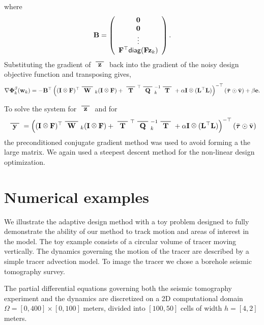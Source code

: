 \documentclass[final,leqno,onefignum,onetabnum]{siamltexmm}
\begin{document}
%
where 
%
\begin{align}
{\bf{B}} =  \left(\begin{array}{c} {\bf 0} \\ {\bf 0}\\ \vdots\\ {\bf{F}}^{\top}{\sf diag}({\bf{F}}{\bf{z}}_k) \end{array}\right).
\end{align}
%
Substituting the gradient of $\zbar $ back into the gradient of the noisy design objective function and transposing gives,
%
\begin{align}
\nabla \bfPhi_k^{\beta}(\bfw_k) = -\bfB^{\top}\left((\bfI \kronecker \bfF)^{\top}\Wbar_k(\bfI \kronecker \bfF)  +
\Tbar^{\top}\Qbar^{-1}_k\Tbar + \alpha \bfI \kronecker(\LtL)
\right)^{- \top}(\bar{\bftau} \odot \bar{\bfv}) + \beta\bfe.
\end{align}
%

To solve the system for $\zbar$ and for
%
\begin{align}
\ybar = \left((\bfI \kronecker \bfF)^{\top}\Wbar_k(\bfI \kronecker \bfF)  +
\Tbar^{\top}\Qbar^{-1}_k\Tbar + \alpha \bfI \kronecker(\LtL)
\right)^{- \top}(\bar{\bftau} \odot \bar{\bfv}) 
\end{align}
%
the preconditioned conjugate gradient method was used 
to avoid forming a the large matrix. We again used a steepest descent method for the non-linear design optimization. 
%
%
%
\section{Numerical examples}
\label{sec: Example1}
We illustrate the adaptive  design method  with a toy problem designed to fully demonstrate the ability of our method to track  motion and areas of interest in the model. The toy  example consists of a  circular volume of tracer  moving vertically. The dynamics governing the motion of the tracer are described by a simple tracer  advection model. 
To image the tracer we chose a   borehole seismic tomography survey.

The partial differential equations governing both the seismic tomography experiment and the dynamics are discretized on a  2D computational domain  $\Omega=[0, 400] \times [0, 100]$ meters,  divided into $[100, 50]$ cells of width $h = [4,2]$ meters.
%
\end{document}
